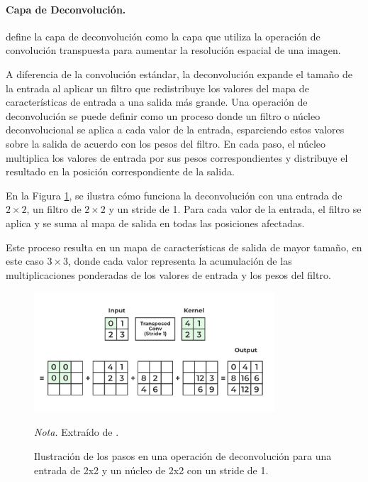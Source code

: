\paragraph{Capa de Deconvolución.}
\citet{somukesh_apply_2023} define la capa de deconvolución como la capa que utiliza la operación de convolución transpuesta para aumentar la resolución espacial de una imagen. 

A diferencia de la convolución estándar, la deconvolución expande el tamaño de la entrada al aplicar un filtro que redistribuye los valores del mapa de características de entrada a una salida más 
grande. Una operación de deconvolución se puede definir como un proceso donde un filtro o núcleo deconvolucional se aplica a cada valor de la entrada, esparciendo estos valores sobre la salida de acuerdo 
con los pesos del filtro. En cada paso, el núcleo multiplica los valores de entrada por sus pesos correspondientes y distribuye el resultado en la posición correspondiente de la salida.

En la Figura \ref{fig:deconvolution_example}, se ilustra cómo funciona la deconvolución con una entrada de $2 \times 2$, un filtro de $2 \times 2$ y un stride de 1. Para cada valor de la entrada, el filtro 
se aplica y se suma al mapa de salida en todas las posiciones afectadas. 

Este proceso resulta en un mapa de características de salida de mayor tamaño, en este caso $3 \times 3$, donde cada valor representa la 
acumulación de las multiplicaciones ponderadas de los valores de entrada y los pesos del filtro.

\begin{figure}[H]
    \centering
    \caption{Ilustración de los pasos en una operación de deconvolución para una entrada de 2x2 y un núcleo de 2x2 con un stride de 1.}
    \label{fig:deconvolution_example}
    \includegraphics[width=0.8\textwidth]{img/4_marco_teorico/upconv.png}
    \begin{flushleft}
        \vspace{-\baselineskip}
        \textit{Nota.} Extraído de \citet{somukesh_apply_2023}.
        \vspace{-\baselineskip}  
    \end{flushleft}
\end{figure}

